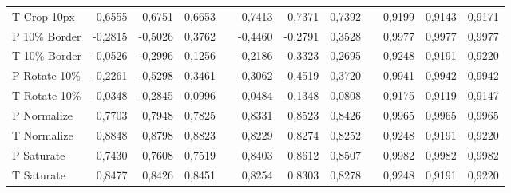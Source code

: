 \documentclass[english,12pt,a4paper,pdftex,elec,utf8, table]{aaltothesis}
\begin{document}
\begin{table}
\begin{center}
\begin{tabular}{@{}lrrrrrrrrrrr@{}}
 T Crop 10px    & 0,6555 & 0,6751 & 0,6653 &\phantom{abc} & 0,7413 & 0,7371 & 0,7392 &\phantom{abc} & 0,9199& 0,9143 & 0,9171 \\
 P 10\% Border  & -0,2815 & -0,5026 & 0,3762 & \phantom{abc} & -0,4460 & -0,2791 & 0,3528 &\phantom{abc} & 0,9977 & 0,9977 & 0,9977 \\
 T 10\% Border  & -0,0526 & -0,2996 & 0,1256 & \phantom{abc} & -0,2186 & -0,3323 & 0,2695&\phantom{abc} & 0,9248 & 0,9191& 0,9220 \\
 P Rotate 10\%  & -0,2261 & -0,5298 & 0,3461 &\phantom{abc} & -0,3062 & -0,4519 & 0,3720 &\phantom{abc} & 0,9941 & 0,9942 & 0,9942\\
 T Rotate 10\%  & -0,0348 & -0,2845 & 0,0996 &\phantom{abc} & -0,0484 & -0,1348 & 0,0808 &\phantom{abc} & 0,9175 & 0,9119 & 0,9147 \\
 P Normalize    & 0,7703 & 0,7948 & 0,7825 & \phantom{abc} & 0,8331 & 0,8523& 0,8426 &\phantom{abc} & 0,9965 & 0,9965 & 0,9965\\
 T Normalize    & 0,8848 & 0,8798 & 0,8823 &\phantom{abc} & 0,8229 & 0,8274& 0,8252&\phantom{abc} & 0,9248 & 0,9191 & 0,9220 \\
 P Saturate     & 0,7430 & 0,7608 & 0,7519 &\phantom{abc} & 0,8403  & 0,8612 & 0,8507 &\phantom{abc} & 0,9982 & 0,9982& 0,9982\\
 T Saturate     & 0,8477 & 0,8426 & 0,8451 &\phantom{abc} & 0,8254& 0,8303& 0,8278 &\phantom{abc} & 0,9248 & 0,9191 & 0,9220\\
    \bottomrule
\end{tabular}
\end{center}\end{table}
\end{document}
